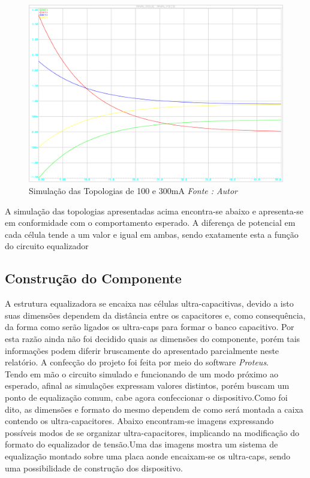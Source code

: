 \documentclass[11pt, a4paper, oneside]{article}
\begin{document}
\begin{figure}[h!]
\centering
\includegraphics[width=0.9\linewidth]{simulacao_topologia_10ma_300ma}
\caption{Simulação das Topologias de 100 e 300mA \textit{Fonte : Autor}}
\label{fig:topologia_dos_equlizadores_utilizados_no_presente_trabalho}
\end{figure}

\newpage

A simulação das topologias apresentadas acima encontra-se abaixo e
apresenta-se em conformidade com o comportamento esperado. A diferença de
potencial em cada célula tende a um valor e igual em ambas, sendo exatamente
esta a função do circuito equalizador

\subsection{Construção do Componente}
A estrutura equalizadora se encaixa nas células ultra-capacitivas, devido a
isto suas dimensões dependem da distância entre os capacitores e, como
consequência, da forma como serão ligados os ultra-caps para formar o banco
capacitivo. Por esta razão ainda não foi decidido quais as dimensões do
componente, porém tais informações podem diferir bruscamente do apresentado
parcialmente neste relatório. A confecção do projeto foi feita por meio do software
\textit{Proteus}.\\
Tendo em mão o circuito simulado e funcionando de um modo próximo ao
esperado, afinal as simulações expressam valores distintos, porém buscam um
ponto de equalização comum, cabe agora confeccionar o dispositivo.Como foi dito,
as dimensões e formato do mesmo dependem de como será montada a caixa
contendo os ultra-capacitores. Abaixo encontram-se imagens expressando
possíveis modos de se organizar ultra-capacitores, implicando na modificação do
formato do equalizador de tensão.Uma das imagens mostra um sistema de
equalização montado sobre uma placa aonde encaixam-se os ultra-caps, sendo uma
possibilidade de construção dos dispositivo.
\end{document}
